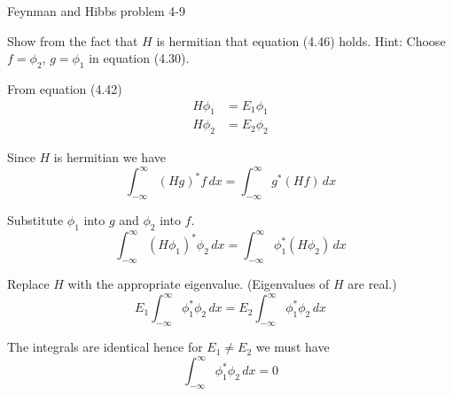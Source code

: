 \documentclass[12pt]{article}
\begin{document}
\begin{center}
Feynman and Hibbs problem 4-9
\end{center}

Show from the fact that $H$ is hermitian that equation (4.46) holds.
Hint: Choose $f=\phi_2$, $g=\phi_1$ in equation (4.30).

\bigskip
From equation (4.42)
\begin{align*}
H\phi_1&=E_1\phi_1
\\
H\phi_2&=E_2\phi_2
\end{align*}

Since $H$ is hermitian we have
\begin{equation*}
\int_{-\infty}^\infty(Hg)^*f\,dx=\int_{-\infty}^\infty g^*(Hf)\,dx
\tag{4.30}
\end{equation*}

Substitute $\phi_1$ into $g$ and $\phi_2$ into $f$.
\begin{equation*}
\int_{-\infty}^\infty(H\phi_1)^*\phi_2\,dx=\int_{-\infty}^\infty \phi_1^*(H\phi_2)\,dx
\end{equation*}

Replace $H$ with the appropriate eigenvalue.
(Eigenvalues of $H$ are real.)
\begin{equation*}
E_1\int_{-\infty}^\infty\phi_1^*\phi_2\,dx=E_2\int_{-\infty}^\infty \phi_1^*\phi_2\,dx
\end{equation*}

The integrals are identical hence for $E_1\ne E_2$ we must have
\begin{equation*}
\int_{-\infty}^\infty\phi_1^*\phi_2\,dx=0
\end{equation*}
\end{document}
